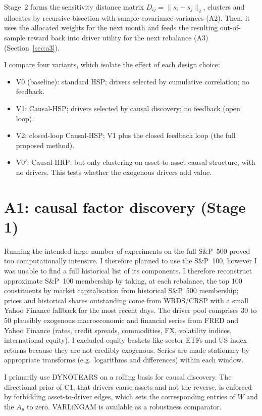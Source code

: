 \documentclass[12pt, a4paper]{report}
\begin{document}
Stage~2 forms the sensitivity distance matrix
$D_{ij} = \lVert s_i - s_j \rVert_2$, clusters and allocates by recursive bisection with
sample-covariance variances (A2). 
Then, it uses the allocated weights for the next month and feeds the resulting out-of-sample
reward back into driver utility for the next rebalance (A3) (Section~\ref{sec:a3}).

I compare four variants, which isolate the effect of each design choice:
\begin{itemize}[itemsep=1pt, topsep=3pt]
  \item V0 (baseline): standard HSP; drivers selected by cumulative correlation; no feedback.
  \item V1: Causal-HSP; drivers selected by causal discovery; no feedback (open loop).
  \item V2: closed-loop Causal-HSP; V1 plus the closed feedback loop (the full proposed method).
  \item V0$'$: Causal-HRP; but only clustering on asset-to-asset causal
        structure, with no drivers. This tests whether the exogenous drivers add value.
\end{itemize}

\section{A1: causal factor discovery (Stage 1)}
\label{sec:a1}

Running the intended large number of experiments on the full S\&P~500 proved too computationally intensive. 
I therefore planned to use the S\&P~100, however I was unable to find a full historical list of its components.
I therefore reconstruct approximate S\&P~100
membership by taking, at each rebalance, the top 100 constituents by market
capitalisation from historical S\&P~500 membership; prices and
historical shares outstanding come from WRDS/CRSP
with a small Yahoo Finance fallback for the most recent days. 
The driver pool comprises 30 to 50
plausibly exogenous macroeconomic and financial series from FRED and Yahoo Finance (rates, credit
spreads, commodities, FX, volatility indices, international equity).
I excluded equity baskets like sector ETFs and US index returns because they are not credibly exogenous.
Series are made stationary by appropriate transforms (e.g.~logarithms and differences) within each window.

I primarily use DYNOTEARS \cite{pamfil2020dynotears} on a rolling basis for causal discovery. The directional
prior of C1, that drivers cause assets and not the reverse, is enforced by forbidding
asset-to-driver edges, which sets the
corresponding entries of $W$ and the $A_p$ to zero.
VARLiNGAM \cite{hyvarinen2010varlingam} is available as a robustness comparator.
\end{document}
